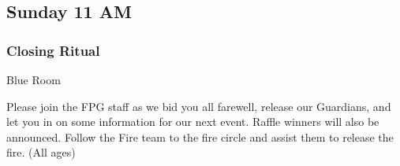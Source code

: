 

\subsection{Sunday 11 AM}

\subsubsection{Closing Ritual}
\label{Sun-CLOSING}
{\small  Blue Room}

 Please join the FPG staff as we bid you all farewell, release our Guardians, and let you in on some information for our next event. Raffle winners will also be announced. Follow the Fire team to the fire circle and assist them to release the fire. {\small (All ages)}